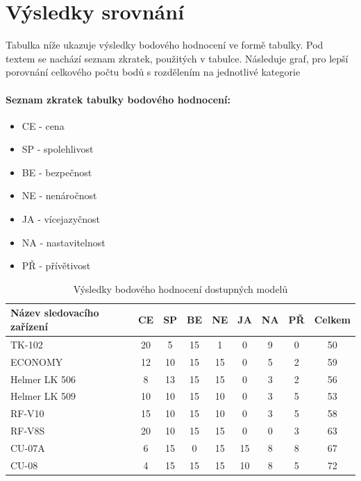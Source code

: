 \documentclass[FM,MP]{tulthesis}  %
\begin{document}

\section{Výsledky srovnání}
Tabulka níže ukazuje výsledky bodového hodnocení ve formě tabulky. Pod textem se nachází seznam zkratek, použitých v tabulce. Následuje graf, pro lepší  porovnání celkového počtu bodů s rozdělením na jednotlivé kategorie

\paragraph{Seznam zkratek tabulky bodového hodnocení:}
\begin{itemize}
\item CE - cena
\item SP - spolehlivost
\item BE - bezpečnost
\item NE - nenáročnost
\item JA - vícejazyčnost
\item NA - nastavitelnost
\item PŘ - přívětivost
\end{itemize}

\renewcommand{\arraystretch}{1.5}
\begin{table}[H]
\begin{center}
\begin{tabular}{| l | c | c| c | c | c | c | c | c |}
\hline
Název sledovacího zařízení & CE & SP & BE & NE & JA & NA & PŘ & Celkem\\
\hline
\hline
TK-102 & 20 & 5 & 15 & 1 & 0 & 9 & 0 & 50\\
\hline
ECONOMY & 12 & 10 & 15 & 15 & 0 & 5 & 2 & 59\\
\hline
Helmer LK 506 & 8 & 13 & 15 & 15 & 0 & 3 & 2 & 56\\
\hline
Helmer LK 509 & 10 & 10 & 15 & 10 & 0 & 3 & 5 & 53\\
\hline
RF-V10 & 15 & 10 & 15 & 10 & 0 & 3 & 5 & 58\\
\hline
RF-V8S & 20 & 10 & 15 & 15 & 0 & 0 & 3 & 63\\
\hline
CU-07A & 6 & 15 & 0 & 15 & 15 & 8 & 8 & 67\\
\hline
CU-08 & 4 & 15 & 15 & 15 & 10 & 8 & 5 & 72\\
\hline
\end{tabular}
\end{center}
\caption{Výsledky bodového hodnocení dostupných modelů}
\end{table}
\end{document}
